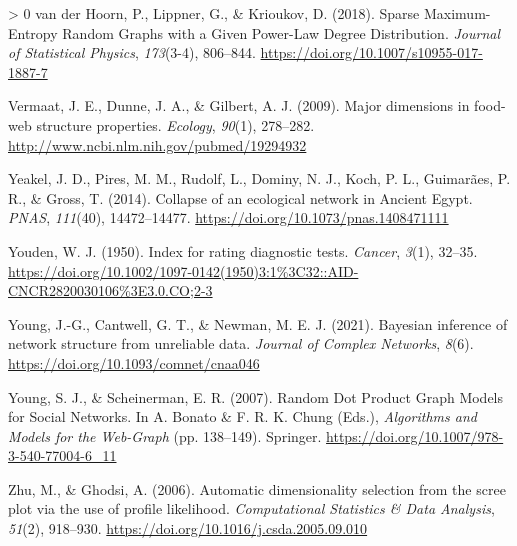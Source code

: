 \documentclass[10pt,oneside]{article}
\newlength{\cslhangindent}
\newenvironment{CSLReferences}[3] %
 {%
  \setlength{\parindent}{0pt}
  \ifodd #1 \everypar{\setlength{\hangindent}{\cslhangindent}}\ignorespaces\fi
  \ifnum #2 > 0
  \setlength{\parskip}{#2\baselineskip}
  \fi
 }%
 {}
\begin{document}
\begin{CSLReferences}{1}{0}
\leavevmode\hypertarget{ref-vanderHoorn2018SpaMax}{}%
van der Hoorn, P., Lippner, G., \& Krioukov, D. (2018). Sparse
Maximum-Entropy Random Graphs with a Given Power-Law Degree
Distribution. \emph{Journal of Statistical Physics}, \emph{173}(3-4),
806--844. \url{https://doi.org/10.1007/s10955-017-1887-7}

\leavevmode\hypertarget{ref-Vermaat2009MajDim}{}%
Vermaat, J. E., Dunne, J. A., \& Gilbert, A. J. (2009). Major dimensions
in food-web structure properties. \emph{Ecology}, \emph{90}(1),
278--282. \url{http://www.ncbi.nlm.nih.gov/pubmed/19294932}

\leavevmode\hypertarget{ref-Yeakel2014ColEco}{}%
Yeakel, J. D., Pires, M. M., Rudolf, L., Dominy, N. J., Koch, P. L.,
Guimarães, P. R., \& Gross, T. (2014). Collapse of an ecological network
in Ancient Egypt. \emph{PNAS}, \emph{111}(40), 14472--14477.
\url{https://doi.org/10.1073/pnas.1408471111}

\leavevmode\hypertarget{ref-Youden1950IndRat}{}%
Youden, W. J. (1950). Index for rating diagnostic tests. \emph{Cancer},
\emph{3}(1), 32--35.
\url{https://doi.org/10.1002/1097-0142(1950)3:1\%3C32::AID-CNCR2820030106\%3E3.0.CO;2-3}

\leavevmode\hypertarget{ref-Young2021BayInf}{}%
Young, J.-G., Cantwell, G. T., \& Newman, M. E. J. (2021). Bayesian
inference of network structure from unreliable data. \emph{Journal of
Complex Networks}, \emph{8}(6).
\url{https://doi.org/10.1093/comnet/cnaa046}

\leavevmode\hypertarget{ref-Young2007RanDot}{}%
Young, S. J., \& Scheinerman, E. R. (2007). Random Dot Product Graph
Models for Social Networks. In A. Bonato \& F. R. K. Chung (Eds.),
\emph{Algorithms and Models for the Web-Graph} (pp. 138--149). Springer.
\url{https://doi.org/10.1007/978-3-540-77004-6_11}

\leavevmode\hypertarget{ref-Zhu2006AutDim}{}%
Zhu, M., \& Ghodsi, A. (2006). Automatic dimensionality selection from
the scree plot via the use of profile likelihood. \emph{Computational
Statistics \& Data Analysis}, \emph{51}(2), 918--930.
\url{https://doi.org/10.1016/j.csda.2005.09.010}

\end{CSLReferences}
\end{document}
